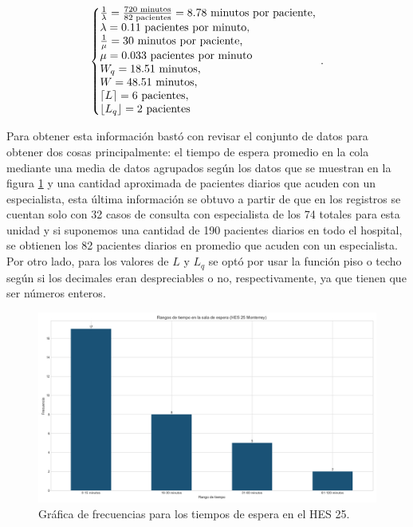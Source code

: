 \documentclass[10pt]{article}
\begin{document}
    \begin{equation*}
    	\left\{
    	\begin{array}{@{}l@{}}
    		\frac{1}{\lambda} = \frac{720 \text{ minutos}}{82 \text{ pacientes}} = 8.78 \text{ minutos por paciente,} \\
    		\lambda = 0.11 \text{ pacientes por minuto,} \\
    		\frac{1}{\mu} = 30 \text{ minutos por paciente,} \\
    		\mu = 0.033 \text{ pacientes por minuto} \\
    		W_{q} = 18.51 \text{ minutos,} \\
    		W = 48.51 \text{ minutos,} \\
    		\left\lceil L \right\rceil = 6 \text{ pacientes,} \\
    		\left\lfloor L_{q} \right\rfloor = 2 \text{ pacientes}
    	\end{array}
    	\right.\,.
    \end{equation*}
    
    Para obtener esta información bastó con revisar el conjunto de datos para obtener dos cosas principalmente: el tiempo de espera promedio en la cola mediante una media de datos agrupados según los datos que se muestran en la figura \ref{fig:frec_espera_hes25} y una cantidad aproximada de pacientes diarios que acuden con un especialista, esta última información se obtuvo a partir de que en los registros se cuentan solo con 32 casos de consulta con especialista de los 74 totales para esta unidad y si suponemos una cantidad de 190 pacientes diarios en todo el hospital, se obtienen los 82 pacientes diarios en promedio que acuden con un especialista. Por otro lado, para los valores de $L$ y $L_{q}$ se optó por usar la función piso o techo según si los decimales eran despreciables o no, respectivamente, ya que tienen que ser números enteros.
    
    \begin{figure}[h]
    	\centering
    	\includegraphics[width=130mm]{./images/rangos-tiempo-espera-hes25.png}
    	\caption{Gráfica de frecuencias para los tiempos de espera en el HES 25.}
    	\label{fig:frec_espera_hes25}
    \end{figure}
    
    \newpage
    
    
    
\end{document}
